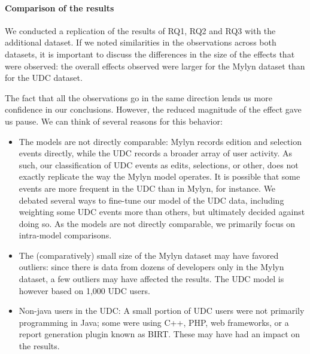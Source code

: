 \documentclass[times]{smrauth}
\begin{document}

\paragraph{Comparison of the results}

We conducted a replication of the results of RQ1, RQ2 and RQ3 with the additional dataset. If we noted similarities in the observations across both datasets, it is important to discuss the differences in the size of the effects that were observed: the overall effects observed were larger for the Mylyn dataset than for the UDC dataset.

The fact that all the observations go in the same direction lends us more confidence in our conclusions. However, the reduced magnitude of the effect gave us pause. We can think of several reasons for this behavior:

\begin{itemize}
\item The models are not directly comparable: Mylyn records edition and selection events directly, while the UDC records a broader array of user activity. As such, our classification of UDC events as edits, selections, or other, does not exactly replicate the way the Mylyn model operates. It is possible that some events are more frequent in the UDC than in Mylyn, for instance. We debated several ways to fine-tune our model of the UDC data, including weighting some UDC events more than others, but ultimately decided against doing so. As the models are not directly comparable, we primarily focus on intra-model comparisons.
\item The (comparatively) small size of the Mylyn dataset may have favored outliers: since there is data from dozens of developers only in the Mylyn dataset, a few outliers may have affected the results. The UDC model is however based on 1,000 UDC users.
\item Non-java users in the UDC: A small portion of UDC users were not primarily programming in Java; some were using C++, PHP, web frameworks, or a report generation plugin known as BIRT. These may have had an impact on the results.
\end{itemize}
\end{document}
